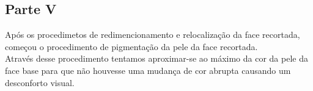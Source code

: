 \documentclass[journal]{IEEEtran}
\begin{document}
\begin{figure}[h]
\centering
{}
\end{figure}



\subsection*{Parte V}

Após os procedimetos de redimencionamento e relocalização da face recortada, começou o procedimento de pigmentação da pele da face recortada.\\
Através desse procedimento tentamos aproximar-se ao máximo da cor da pele da face base para que não houvesse uma mudança de cor abrupta causando um desconforto visual. 
\end{document}
